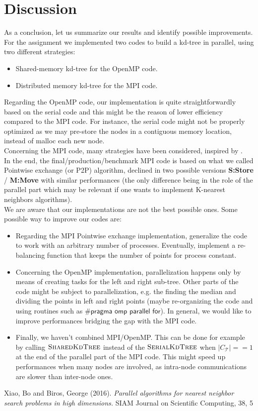 \documentclass[amssymb, aps,nofootinbib, superscriptaddress, notitlepage]{revtex4}
\begin{document}
\section{Discussion}

As a conclusion, let us  summarize our results and identify possible improvements.
\\
For the assignment we implemented two codes to build a kd-tree in parallel, using two different strategies:
\begin{itemize}
\item Shared-memory kd-tree for the OpenMP code. 
\item Distributed memory kd-tree for the MPI code.
\end{itemize}
Regarding the OpenMP code, our implementation is quite straightforwardly  based on the serial code and  this might be  the  reason of lower efficiency compared to the MPI code. For instance, the serial code might not be properly optimized as we may pre-store the nodes in a contiguous memory location, instead of malloc each new node.
\\
Concerning the MPI code,  many strategies  have been considered, inspired by  \cite{xiao2016parallel}.
\\
In the end, the final/production/benchmark MPI code is based on what we called Pointwise exchange (or P2P) algorithm, declined in two possible versions \textbf{S:Store} / \textbf{M:Move} with similar performances (the only difference being in the role of the parallel part which may be relevant if one wants to implement  K-nearest neighbors algorithms). 
\\
We are aware that our implementations are not the best possible ones. Some possible way to improve our codes are:
\begin{itemize}
\item Regarding the MPI Pointwise exchange implementation, generalize the code to work with an arbitrary number of processes. Eventually, implement a re-balancing  function that keeps the number of points for process constant.
 \item Concerning the OpenMP implementation, parallelization happens only by means of creating tasks for  the left and right sub-tree. Other parts of the code might be subject to parallelization, e.g. the finding the median and dividing the points in left and right points (maybe re-organizing the code and using routines such as $\textsf{\#pragma omp parallel for}$). In general, we would like to improve performances bridging the gap with the MPI code.
 \item  Finally,  we haven't combined MPI/OpenMP. This can be done for example by calling $\textsc{SharedKdTree}$ instead of the $\textsc{SerialKdTree}$ when $|C_{\mathcal{T}}|==1$ at the end of the parallel part of the MPI code.
 This might speed up performances when  many nodes are involved, as intra-node communications are slower than inter-node ones.
\end{itemize}

\begin{thebibliography}{9}


Xiao, Bo and Biros, George (2016).
\textit{Parallel algorithms for nearest neighbor search problems in high dimensions.} SIAM Journal on Scientific Computing, 38, 5

\end{thebibliography}
\end{document}
